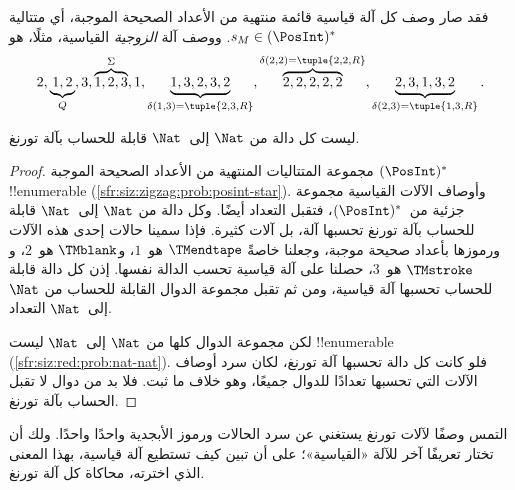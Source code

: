 \documentclass[../../../include/open-logic-section]{subfiles}
\begin{document}
\begin{explain}
فقد صار وصف كل آلة قياسية قائمة منتهية من الأعداد الصحيحة الموجبة،
أي متتالية $s_M\in(\PosInt)^*$. ووصف آلة \emph{الزوجية} القياسية،
مثلًا، هو
\[
2, \underbrace{1, 2}_Q, 3, \overbrace{1, 2, 3}^\Sigma, 1, \underbrace{1, 3, 2, 3, 2}_{\delta(1,3) = \tuple{2,3,R}},
\overbrace{2, 2, 2, 2, 2}^{\delta(2,2) = \tuple{2,2,R}},
\underbrace{2, 3, 1, 3, 2}_{\delta(2,3) = \tuple{1,3,R}}.
\]
\end{explain}

\begin{thm}
ليست كل دالة من $\Nat$ إلى~$\Nat$ قابلة للحساب بآلة تورنغ.
\end{thm}

\begin{proof}
مجموعة المتتاليات المنتهية من الأعداد الصحيحة الموجبة
$(\PosInt)^*$ !!{enumerable}
(\cref{sfr:siz:zigzag:prob:posint-star}). وأوصاف الآلات القياسية
مجموعة جزئية من~$(\PosInt)^*$، فتقبل التعداد أيضًا. وكل دالة من
$\Nat$ إلى~$\Nat$ قابلة للحساب بآلة تورنغ تحسبها آلة، بل آلات كثيرة.
فإذا سمينا حالات إحدى هذه الآلات ورموزها بأعداد صحيحة موجبة، وجعلنا
خاصةً $\TMendtape$ هو~$1$، و$\TMblank$ هو~$2$،
و$\TMstroke$ هو~$3$، حصلنا على آلة قياسية تحسب الدالة نفسها.
إذن كل دالة قابلة للحساب تحسبها آلة قياسية، ومن ثم تقبل مجموعة
الدوال القابلة للحساب من $\Nat$ إلى~$\Nat$ التعداد.

لكن مجموعة الدوال كلها من $\Nat$ إلى~$\Nat$ ليست !!{enumerable}
(\cref{sfr:siz:red:prob:nat-nat}). فلو كانت كل دالة تحسبها آلة
تورنغ، لكان سرد أوصاف الآلات التي تحسبها تعدادًا للدوال جميعًا، وهو
خلاف ما ثبت. فلا بد من دوال لا تقبل الحساب بآلة تورنغ.
\end{proof}

\begin{prob}
  التمس وصفًا لآلات تورنغ يستغني عن سرد الحالات ورموز الأبجدية واحدًا
  واحدًا. ولك أن تختار تعريفًا آخر للآلة «القياسية»؛ على أن تبين
  كيف تستطيع آلة قياسية، بهذا المعنى الذي اخترته، محاكاة كل آلة تورنغ.
\end{prob}
\end{document}
